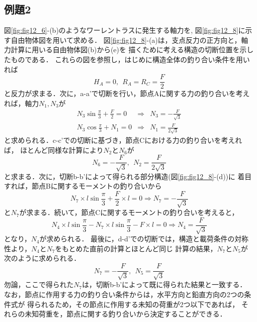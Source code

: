 \documentclass[10pt,a4j]{jarticle}
\begin{document}
\subsection{例題2}
図\ref{fig:fig12_6}-(b)のようなワーレントラスに発生する軸力を, 
図\ref{fig:fig12_8}に示す自由物体図を用いて求める．
図\ref{fig:fig12_8}-(a)は，支点反力の正方向と，軸力計算に用いる自由物体図(b)から(e)を
描くために考える構造の切断位置を示したものである．
これらの図を参照し，はじめに構造全体の釣り合い条件を用いれば
\begin{equation}
	H_A=0, \ \ R_A=R_C=\frac{F}{2}
\end{equation}
と反力が求まる．次に，a-a'で切断を行い，節点Aに関する力の釣り合いを考えれば，軸力$N_1,N_3$が
\begin{eqnarray}
	N_3\sin\frac{\pi}{3}+\frac{F}{2}=0 
	&\Rightarrow  & 
	N_3=-\frac{F}{\sqrt{3}} \\
	N_3\cos\frac{\pi}{3}+N_1=0
	&\Rightarrow  & 
	N_1=\frac{F}{2\sqrt{3}} 
\end{eqnarray}
と求められる．c-c'での切断に基づき，節点Cにおける力の釣り合いを考えれば，
ほとんど同様な計算により$N_2$と$N_6$が
\begin{equation}
	N_6=-\frac{F}{\sqrt{3}}, \ \ N_2=\frac{F}{2\sqrt{3}} 
	\label{eqn:}
\end{equation}
と求まる．次に，切断b-b'によって得られる部分構造(図\ref{fig:fig12_8}-(d))に
着目すれば，節点Bに関するモーメントの釣り合いから
\begin{equation}
	N_7 \times l\sin\frac{\pi}{3}+\frac{F}{2}\times l =0 \Rightarrow 
	N_7=-\frac{F}{\sqrt{3}}
\end{equation}
と$N_7$が求まる．続いて，節点Cに関するモーメントの釣り合いを考えると，
\begin{equation}
	N_4 \times l\sin\frac{\pi}{3}- N_7 \times l\sin\frac{\pi}{3} - F\times l =0 \Rightarrow 
	N_4=\frac{F}{\sqrt{3}}
\end{equation}
となり，$N_4$が求められる．
最後に，d-d'での切断では，構造と載荷条件の対称性より，$N_4$と$N_7$をもとめた直前の計算とほとんど同じ
計算の結果，$N_7$と$N_5$が次のように求められる．
\begin{equation}
	N_7=-\frac{F}{\sqrt{3}}
	, \ \ 
	N_5=\frac{F}{\sqrt{3}}
	\label{eqn:}
\end{equation}
勿論，ここで得られた$N_7$は，切断b-b'によって既に得られた結果と一致する．
なお，節点に作用する力の釣り合い条件からは，水平方向と鉛直方向の2つの条件式が
得られるため，その節点に作用する未知の荷重が2つ以下であれば，
それらの未知荷重を，節点に関する釣り合いから決定することができる．
\end{document}
